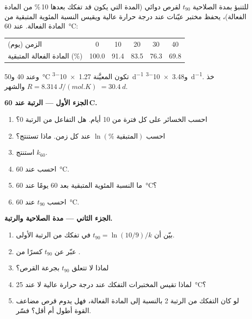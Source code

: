 \begin{problem}
\label{pb:b1:rate-laws:1}
للتنبؤ بمدة الصلاحية $t_{90}$ لقرص دوائي (المدة التي يكون قد تفكك بعدها 10\,\%
من المادة الفعالة)، يحفظ مختبر عيّنات عند
درجة حرارة عالية ويقيس النسبة المئوية المتبقية من المادة الفعالة. عند
\qty{60}{\celsius}:
\begin{center}
\begin{tabular}{lccccc}
\hline
الزمن (يوم) & 0 & 10 & 20 & 30 & 40 \\
المادة الفعالة المتبقية (\%) & 100.0 & 91.4 & 83.5 & 76.3 & 69.8 \\
\hline
\end{tabular}
\end{center}
وعند 40 و\qty{50}{\celsius} تكون  المعيَّنة
\qty{1.27e-3}{d^{-1}} و\qty{3.48e-3}{d^{-1}}. خذ $R =
\qty{8.314}{J/(mol.K)}$ والشهر $= \qty{30.4}{d}$.

\medskip
\noindent\textbf{الجزء الأول --- الرتبة عند 60\,\textdegree C.}
\begin{enumerate}
  \item احسب الخسائر على كل فترة من 10 أيام. هل التفاعل من
        الرتبة 0؟
  \item احسب $\ln(\%\text{ المتبقية})$ عند كل زمن. ماذا تستنتج؟
  \item استنتج  $k_{60}$.
  \item احسب  عند \qty{60}{\celsius}.
  \item ما النسبة المئوية المتبقية بعد 60 يومًا عند \qty{60}{\celsius}؟
  \item احسب $t_{90}$ عند \qty{60}{\celsius}.
\end{enumerate}

\medskip
\noindent\textbf{الجزء الثاني --- مدة الصلاحية والرتبة.}
\begin{enumerate}[resume]
  \item بيّن أن $t_{90} = \ln(10/9)/k$ في تفكك من الرتبة الأولى.
  \item عبّر عن $t_{90}$ كسرًا من .
  \item لماذا لا تتعلق $t_{90}$ بجرعة القرص؟
  \item لماذا تقيس المختبرات التفكك عند درجة حرارة عالية
        لا عند \qty{25}{\celsius}؟
  \item لو كان التفكك من الرتبة 2 بالنسبة إلى المادة الفعالة، فهل يدوم
        قرص مضاعف القوة أطول أم أقل؟ فسّر.
\end{enumerate}


\end{problem}
